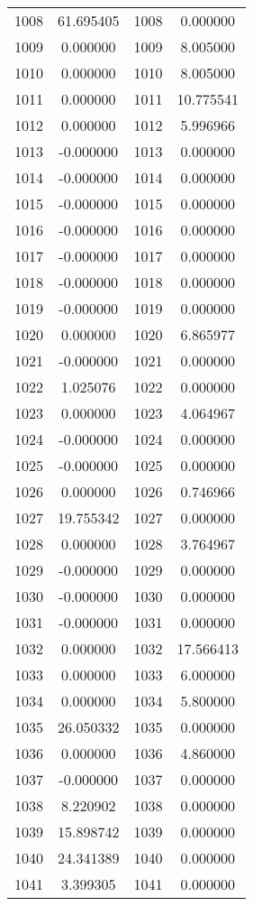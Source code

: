 \documentclass[12pt]{article}
\begin{document}
\begin{longtable}{@{}cccc@{}}
1008 & 61.695405 & 1008 & 0.000000 \\
1009 & 0.000000 & 1009 & 8.005000 \\
1010 & 0.000000 & 1010 & 8.005000 \\
1011 & 0.000000 & 1011 & 10.775541 \\
1012 & 0.000000 & 1012 & 5.996966 \\
1013 & -0.000000 & 1013 & 0.000000 \\
1014 & -0.000000 & 1014 & 0.000000 \\
1015 & -0.000000 & 1015 & 0.000000 \\
1016 & -0.000000 & 1016 & 0.000000 \\
1017 & -0.000000 & 1017 & 0.000000 \\
1018 & -0.000000 & 1018 & 0.000000 \\
1019 & -0.000000 & 1019 & 0.000000 \\
1020 & 0.000000 & 1020 & 6.865977 \\
1021 & -0.000000 & 1021 & 0.000000 \\
1022 & 1.025076 & 1022 & 0.000000 \\
1023 & 0.000000 & 1023 & 4.064967 \\
1024 & -0.000000 & 1024 & 0.000000 \\
1025 & -0.000000 & 1025 & 0.000000 \\
1026 & 0.000000 & 1026 & 0.746966 \\
1027 & 19.755342 & 1027 & 0.000000 \\
1028 & 0.000000 & 1028 & 3.764967 \\
1029 & -0.000000 & 1029 & 0.000000 \\
1030 & -0.000000 & 1030 & 0.000000 \\
1031 & -0.000000 & 1031 & 0.000000 \\
1032 & 0.000000 & 1032 & 17.566413 \\
1033 & 0.000000 & 1033 & 6.000000 \\
1034 & 0.000000 & 1034 & 5.800000 \\
1035 & 26.050332 & 1035 & 0.000000 \\
1036 & 0.000000 & 1036 & 4.860000 \\
1037 & -0.000000 & 1037 & 0.000000 \\
1038 & 8.220902 & 1038 & 0.000000 \\
1039 & 15.898742 & 1039 & 0.000000 \\
1040 & 24.341389 & 1040 & 0.000000 \\
1041 & 3.399305 & 1041 & 0.000000 \\

\end{longtable}
\end{document}
